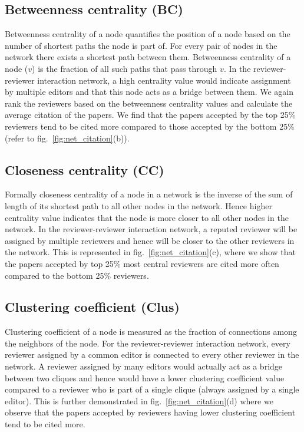 \subsection{Betweenness centrality (BC)}

Betweenness centrality of a node quantifies the position of a node based on the number of shortest paths the node is part of. For every  pair of nodes in the network there exists a shortest path between them. Betweenness centrality of a node ($v$) is the fraction of all such paths that pass through $v$. In the reviewer-reviewer interaction network, a high  centrality value would indicate assignment by multiple editors and that this node acts as a bridge between them. We again rank the reviewers based on the betweenness centrality values and calculate the average citation of the papers. We find that the papers accepted by the top 25\% reviewers tend to be cited more compared to those accepted by the bottom 25\% (refer to fig.~\ref{fig:net_citation}(b)). 

\subsection{Closeness centrality (CC)}

Formally closeness centrality of a node in a network is the inverse of the sum of length of its shortest path to all other nodes in the network. Hence higher centrality value indicates that the node is more closer to all other nodes in the network. In the reviewer-reviewer interaction network, a reputed reviewer will be assigned by multiple reviewers and hence will be closer to the other reviewers in the network. This is represented in fig.~\ref{fig:net_citation}(c), where we show that the papers accepted by top 25\% most central reviewers 
are cited more often compared to the bottom 25\% reviewers. 
\vspace{-3mm}
\subsection{Clustering coefficient (Clus)}

Clustering coefficient of a node is measured as the fraction of connections among the neighbors of the node. For the reviewer-reviewer interaction network, every reviewer assigned by a common editor is connected to every other reviewer in the network. A reviewer assigned by many editors would actually act as a bridge between two cliques and hence would have a lower clustering coefficient value compared to a reviewer who is part of a single clique (always assigned by a single editor). This is further demonstrated in  fig.~\ref{fig:net_citation}(d) where we observe that the papers accepted by reviewers having lower clustering coefficient tend to be cited more.

